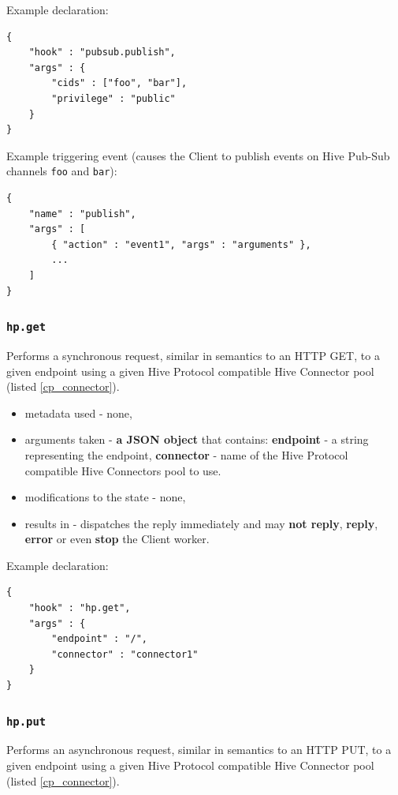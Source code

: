 \documentclass[a4paper]{article}
\begin{document}
\noindent
Example declaration:

\begin{verbatim}
{
    "hook" : "pubsub.publish",
    "args" : {
        "cids" : ["foo", "bar"],
        "privilege" : "public"
    }
}
\end{verbatim}




\noindent
Example triggering event (causes the Client to publish events on Hive Pub-Sub channels \texttt{foo} and \texttt{bar}):


\begin{verbatim}
{
    "name" : "publish",
    "args" : [
        { "action" : "event1", "args" : "arguments" },
        ...
    ]
}
\end{verbatim}
\subsubsection{\texttt{hp.get}}
\label{sec-8-2-7}
\label{ref-hive_protocol_hook}

Performs a synchronous request, similar in semantics to an HTTP GET, to a given endpoint using a given Hive Protocol compatible Hive Connector pool (listed \ref{cp_connector}).


\begin{itemize}
\item metadata used - none,
\item arguments taken - \textbf{a JSON object} that contains: \textbf{endpoint} - a string representing the endpoint, \textbf{connector} - name of the Hive Protocol compatible Hive Connectors pool to use.
\item modifications to the state - none,
\item results in - dispatches the reply immediately and may \textbf{not reply}, \textbf{reply}, \textbf{error} or even \textbf{stop} the Client worker.
\end{itemize}

\noindent
Example declaration:

\begin{verbatim}
{
    "hook" : "hp.get",
    "args" : {
        "endpoint" : "/",
        "connector" : "connector1"
    }
}
\end{verbatim}
\subsubsection{\texttt{hp.put}}
\label{sec-8-2-8}

Performs an asynchronous request, similar in semantics to an HTTP PUT, to a given endpoint using a given Hive Protocol compatible Hive Connector pool (listed \ref{cp_connector}).
\end{document}
